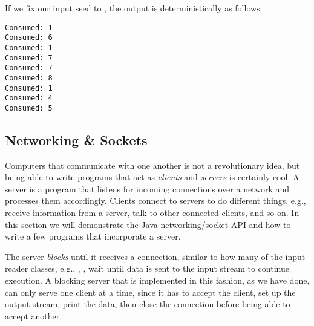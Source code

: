 If we fix our input seed to , the output is deterministically as follows:

\par{
\begin{verbatim}
Consumed: 1
Consumed: 6
Consumed: 1
Consumed: 7
Consumed: 7
Consumed: 8
Consumed: 1
Consumed: 4
Consumed: 5
\end{verbatim}
}

\subsection*{Networking \& Sockets}

Computers that communicate with one another is not a revolutionary idea, but being able to write programs that act as \textit{clients} and \textit{servers} is certainly cool. A server is a program that listens for incoming connections over a network and processes them accordingly. Clients connect to servers to do different things, e.g., receive information from a server, talk to other connected clients, and so on. In this section we will demonstrate the Java networking/socket API and how to write a few programs that incorporate a server.


The server \textit{blocks} until it receives a connection, similar to how many of the input reader classes, e.g., , , wait until data is sent to the input stream to continue execution. A blocking server that is implemented in this fashion, as we have done, can only serve one client at a time, since it has to accept the client, set up the output stream, print the data, then close the connection before being able to accept another.

